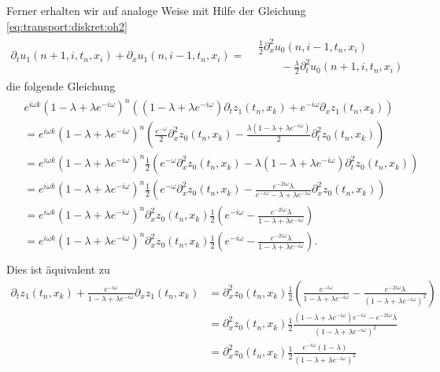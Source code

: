 Ferner erhalten wir auf analoge Weise mit Hilfe der Gleichung \eqref{eq:transport:diskret:oh2}
{\small
\begin{align}
\partial_t u_1(n+1, i, t_n, x_i) + \partial_x u_1(n, i-1, t_n, x_i)
= \begin{split}
&\frac {1}{2} \partial^2_x u_0(n, i-1, t_n, x_i)\\
&\qquad - \frac{\lambda}{2} \partial^2_t u_0(n+1, i, t_n, x_i)
\end{split}
\end{align}
}
die folgende Gleichung
\begin{align}
\begin{split}
&e^{i \omega k} (1 - \lambda + \lambda e^{-i \omega})^{n} \left( (1 - \lambda + \lambda e^{-i \omega}) \partial_t z_1(t_n, x_k) + e^{- i \omega} \partial_x z_1(t_n, x_k) \right)\\
&= e^{i \omega k} (1 - \lambda + \lambda e^{-i \omega})^{n} \left( \frac{e^{-\omega}}{2} \partial^2_x z_0(t_n, x_k) - \frac{\lambda(1 - \lambda + \lambda e^{-i \omega})}{2} \partial^2_t z_0(t_n, x_k) \right)\\
&= e^{i \omega k} (1 - \lambda + \lambda e^{-i \omega})^{n} \frac{1}{2} \left( e^{-\omega} \partial^2_x z_0(t_n, x_k) - \lambda (1 - \lambda + \lambda e^{-i \omega}) \partial^2_t z_0(t_n, x_k) \right)\\
&= e^{i \omega k} (1 - \lambda + \lambda e^{-i \omega})^{n} \frac{1}{2} \left( e^{-\omega} \partial^2_x z_0(t_n, x_k) - \frac{e^{- 2i \omega} \lambda}{e^{-i \omega} - \lambda + \lambda e^{-i \omega}} \partial^2_x z_0(t_n, x_k) \right)\\
&= e^{i \omega k} (1 - \lambda + \lambda e^{-i \omega})^{n} \partial^2_x z_0(t_n, x_k) \frac{1}{2} \left( e^{-i \omega} - \frac{e^{- 2 i \omega} \lambda}{1 - \lambda + \lambda e^{-i \omega}}  \right)\\
&= e^{i \omega k} (1 - \lambda + \lambda e^{-i \omega})^{n} \partial^2_x z_0(t_n, x_k) \frac{1}{2} \left( e^{-i \omega} - \frac{e^{- 2 i \omega} \lambda}{1 - \lambda + \lambda e^{-i \omega}}  \right).\\
\end{split}
\end{align}
Dies ist äquivalent zu
\begin{align*}
\partial_t z_1(t_n, x_k) + \frac{e^{- i \omega}}{1 - \lambda + \lambda e^{-i \omega}} \partial_x z_1(t_n, x_k)
&= \partial^2_x z_0(t_n, x_k) \frac{1}{2} \left( \frac{e^{-i \omega}}{1 - \lambda + \lambda e^{-i \omega}} - \frac{e^{- 2 i \omega} \lambda}{(1 - \lambda + \lambda e^{-i \omega})^2}  \right)\\
&= \partial^2_x z_0(t_n, x_k) \frac{1}{2} \frac{ (1 - \lambda + \lambda e^{-i \omega}) e^{-i \omega} - e^{- 2 i \omega} \lambda}{(1 - \lambda + \lambda e^{-i \omega})^2}\\
&= \partial^2_x z_0(t_n, x_k) \frac{1}{2} \frac{ e^{-i \omega} (1- \lambda)}{(1 - \lambda + \lambda e^{-i \omega})^2}
\end{align*}
